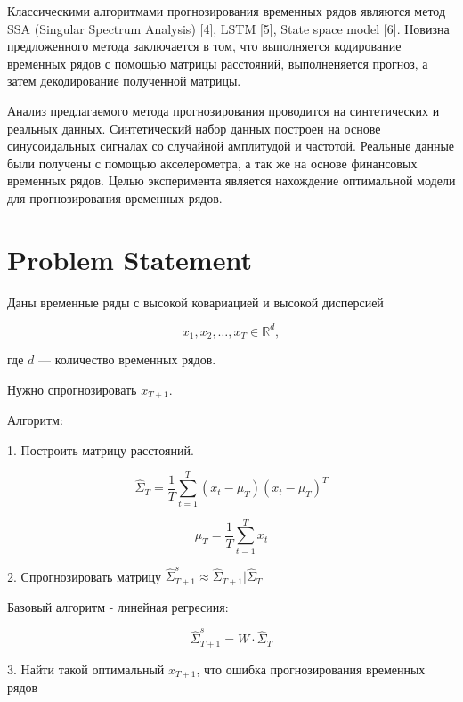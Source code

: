 \documentclass{article}
\begin{document}
Классическими алгоритмами прогнозирования временных рядов являются метод SSA (Singular Spectrum Analysis) [4], LSTM [5], State space model [6]. Новизна предложенного метода заключается в том, что выполняется кодирование временных рядов с помощью матрицы расстояний, выполненяется прогноз, а затем декодирование полученной матрицы.

Анализ предлагаемого метода прогнозирования проводится на синтетических и реальных данных. Синтетический набор данных построен на основе синусоидальных сигналах со случайной амплитудой и частотой. Реальные данные были получены с помощью акселерометра, а так же на основе финансовых временных рядов. Целью эксперимента является нахождение оптимальной модели для прогнозирования временных рядов.

\section{Problem Statement}
\label{sec:headings}

Даны временные ряды с высокой ковариацией и высокой дисперсией


\begin{equation}
	x_1, x_2, \ldots, x_T \in \mathbb{R}^d,
\end{equation}

где $d$ — количество временных рядов.

Нужно спрогнозировать $x_{T+1}$.

Алгоритм:

1. Построить матрицу расстояний.

\begin{equation}
\hat{\Sigma}_T = \frac{1}{T} \sum_{t=1}^{T} (x_t - \mu_T)(x_t - \mu_T)^T
\end{equation}

\begin{equation}
\mu_T = \frac{1}{T} \sum_{t=1}^{T} x_t
\end{equation}

2. Спрогнозировать матрицу $\hat{\Sigma}_{T+1}^s \approx \hat{\Sigma}_{T+1} | \hat{\Sigma}_{T}$

Базовый алгоритм - линейная регресиия:

\begin{equation}
\hat{\Sigma}_{T+1}^s = W \cdot \hat{\Sigma}_{T}
\end{equation}


3. Найти такой оптимальный $x_{T+1}$, что ошибка прогнозирования временных рядов
\end{document}
